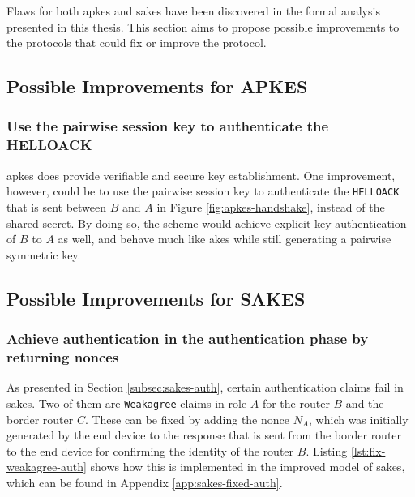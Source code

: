 Flaws for both \gls{apkes} and \gls{sakes} have been discovered in the formal analysis presented in this thesis. This section aims to propose possible improvements to the protocols that could fix or improve the protocol.

\subsection{Possible Improvements for APKES}

\subsubsection{Use the pairwise session key to authenticate the HELLOACK}

\gls{apkes} does provide verifiable and secure key establishment. One improvement, however, could be to use the pairwise session key to authenticate the \texttt{HELLOACK} that is sent between $B$ and $A$ in Figure \ref{fig:apkes-handshake}, instead of the shared secret. By doing so, the scheme would achieve explicit key authentication of $B$ to $A$ as well, and behave much like \gls{akes} while still generating a pairwise symmetric key.



\subsection{Possible Improvements for SAKES}
\label{subsec:sakes-fix}

\subsubsection{Achieve authentication in the authentication phase by returning nonces}


As presented in Section \ref{subsec:sakes-auth}, certain authentication claims fail in \gls{sakes}. Two of them are \texttt{Weakagree} claims in role $A$ for the router $B$ and the border router $C$. These can be fixed by adding the nonce $N_A$, which was initially generated by the end device to the response that is sent from the border router to the end device for confirming the identity of the router $B$. Listing \ref{lst:fix-weakagree-auth} shows how this is implemented in the improved model of \gls{sakes}, which can be found in Appendix \ref{app:sakes-fixed-auth}.\\

